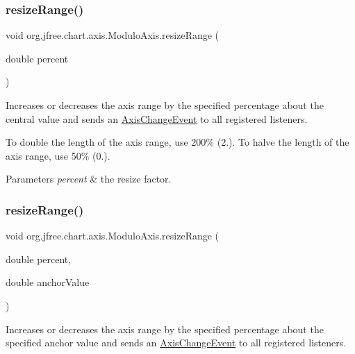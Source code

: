 \subsubsection{\texorpdfstring{resize\+Range()}{resizeRange()}\hspace{0.1cm}{\footnotesize\ttfamily [1/2]}}
{\footnotesize\ttfamily void org.\+jfree.\+chart.\+axis.\+Modulo\+Axis.\+resize\+Range (\begin{DoxyParamCaption}\item[{double}]{percent }\end{DoxyParamCaption})}

Increases or decreases the axis range by the specified percentage about the central value and sends an \mbox{\hyperlink{}{Axis\+Change\+Event}} to all registered listeners. 

To double the length of the axis range, use 200\% (2.). To halve the length of the axis range, use 50\% (0.).


\begin{DoxyParams}{Parameters}
{\em percent} & the resize factor. \\
\hline
\end{DoxyParams}
\mbox{\label{classorg_1_1jfree_1_1chart_1_1axis_1_1_modulo_axis_add261c68e8ad12b55939a523aef85580}} 
\subsubsection{\texorpdfstring{resize\+Range()}{resizeRange()}\hspace{0.1cm}{\footnotesize\ttfamily [2/2]}}
{\footnotesize\ttfamily void org.\+jfree.\+chart.\+axis.\+Modulo\+Axis.\+resize\+Range (\begin{DoxyParamCaption}\item[{double}]{percent,  }\item[{double}]{anchor\+Value }\end{DoxyParamCaption})}

Increases or decreases the axis range by the specified percentage about the specified anchor value and sends an \mbox{\hyperlink{}{Axis\+Change\+Event}} to all registered listeners. 

